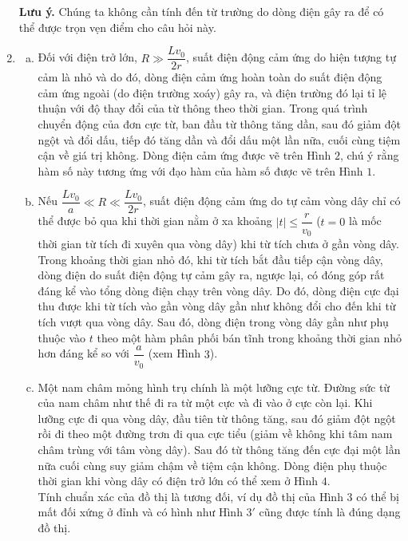 \begin{loigiai}
\begin{enumerate}[1)]
\textbf{Lưu ý.} Chúng ta không cần tính đến từ trường do dòng điện gây ra để có thể được trọn vẹn điểm cho câu hỏi này. 
\item 
\begin{enumerate}[a)] \item Đối với điện trở lớn, $R\gg\dfrac{Lv_0}{2r}$, suất điện động cảm ứng do hiện tượng tự cảm là nhỏ và do đó, dòng điện cảm ứng hoàn toàn do suất điện động cảm ứng ngoài (do điện trường xoáy) gây ra, và điện trường đó lại tỉ lệ thuận với độ thay đổi của từ thông theo thời gian. Trong quá trình chuyển động của đơn cực từ, ban đầu từ thông tăng dần, sau đó giảm đột ngột và đổi dấu, tiếp đó tăng dần và đổi dấu một lần nữa, cuối cùng tiệm cận về giá trị không. Dòng điện cảm ứng được vẽ trên Hình $2$, chú ý rằng hàm số này tương ứng với đạo hàm của hàm số được vẽ trên Hình $1$.
   \item Nếu $\dfrac{Lv_0}{a} \ll R\ll \dfrac{Lv_0}{2r}$, suất điện động cảm ứng do tự cảm vòng dây chỉ có thể được bỏ qua khi thời gian nằm ở xa khoảng $|t| \leq \dfrac{r}{v_0}$ ($t=0$ là mốc thời gian từ tích đi xuyên qua vòng dây) khi từ tích chưa ở gần vòng dây. Trong khoảng thời gian nhỏ đó, khi từ tích bắt đầu tiếp cận vòng dây, dòng điện do suất điện động tự cảm gây ra, ngược lại, có đóng góp rất đáng kể vào tổng dòng điện chạy trên vòng dây. Do đó, dòng điện cực đại thu được khi từ tích vào gần vòng dây gần như không đổi cho đến khi từ tích vượt qua vòng dây. Sau đó, dòng điện trong vòng dây gần như phụ thuộc vào $t$ theo một hàm phân phối bán tĩnh trong khoảng thời gian nhỏ hơn đáng kể so với $\dfrac{a}{v_0}$ (xem Hình $3$).
 \item Một nam châm mỏng hình trụ chính là một lưỡng cực từ. Đường sức từ của nam châm như thế đi ra từ một cực và đi vào ở cực còn lại. Khi lưỡng cực đi qua vòng dây, đầu tiên từ thông tăng, sau đó giảm đột ngột rồi đi theo một đường trơn đi qua cực tiểu (giảm về không khi tâm nam châm trùng với tâm vòng dây). Sau đó từ thông tăng đến cực đại một lần nữa cuối cùng suy giảm chậm về tiệm cận không. Dòng điện phụ thuộc thời gian khi vòng dây có điện trở lớn có thể xem ở Hình $4$.\\
 
 Tính chuẩn xác của đồ thị là tương đối, ví dụ đồ thị của Hình $3$ có thể bị mất đối xứng ở đỉnh và có hình như Hình $3'$ cũng được tính là đúng dạng đồ thị.
   \begin{center}

\begin{tikzpicture}[x=0.75pt,y=0.75pt,yscale=-1,xscale=1]


\end{tikzpicture}
\end{center}
\end{enumerate}
\end{enumerate}
\end{loigiai}
